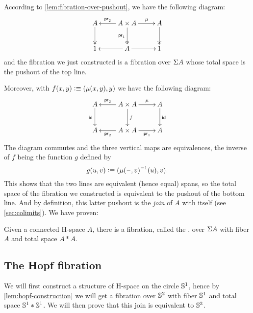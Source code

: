 According to \autoref{lem:fibration-over-pushout}, we have the following
diagram:
%
\[\xymatrix{A \ar@{->>}[d] & A \times A \ar[l]_-{\proj2} \ar@{->>}_{\proj1}[d]
  \ar[r]^-{\mu} & A \ar@{->>}[d] \\
  1 & A \ar[r] \ar[l] & 1}\]
%
and the fibration we just constructed is a fibration over $\Sigma A$ whose total
space is the pushout of the top line.

Moreover, with $f(x,y)\vcentcolon\equiv(\mu(x,y),y)$ we have the following diagram:
%
\[\xymatrix{A \ar_\idfunc[d] & A \times A \ar[l]_-{\proj2} \ar^f[d]
  \ar[r]^-{\mu} & A \ar^\idfunc[d] \\
  A & A\times A \ar^-{\proj2}[l] \ar_-{\proj1}[r] & A}\]
%
The diagram commutes and the three vertical maps are equivalences, the inverse
of $f$ being the function $g$ defined by
\[g(u,v)\vcentcolon\equiv(\mathord{{\mu(\mathord{\hspace{1pt}\text{--}\hspace{1pt}},v)}^{-1}}(u),v).\]
%
This shows that the two lines are equivalent (hence equal) spans, so the total
space of the fibration we constructed is equivalent to the pushout of the bottom
line.
And by definition, this latter pushout is the \emph{join} of $A$ with itself (see \autoref{sec:colimits}).
%
We have proven:

\begin{lem}\label{lem:hopf-construction}
  Given a connected H-space $A$, there is a fibration, called the
  ,
  over $\Sigma A$ with fiber $A$ and total space $A*A$.
\end{lem}

\subsection{The Hopf fibration}

We will first construct a structure of H-space on the circle $\mathbb{S}^1$, hence by
\autoref{lem:hopf-construction} we will get a fibration over $\mathbb{S}^2$ with fiber
$\mathbb{S}^1$ and total space $\mathbb{S}^1*\mathbb{S}^1$. We will then prove that this join is
equivalent to $\mathbb{S}^3$.

